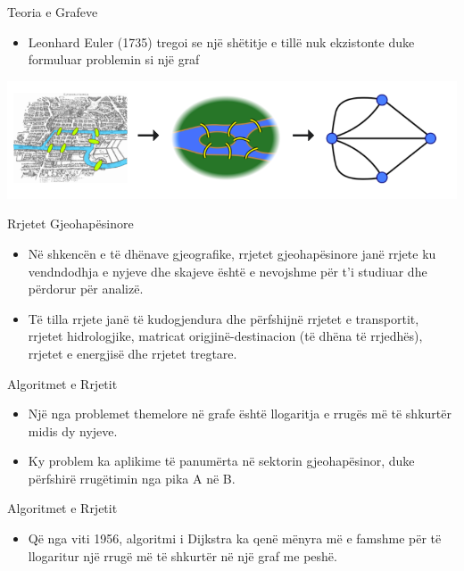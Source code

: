 \documentclass[
  ignorenonframetext,
]{beamer}
\providecommand{\tightlist}{%
  \setlength{\itemsep}{0pt}\setlength{\parskip}{0pt}}
\begin{document}
\begin{frame}{Teoria e Grafeve}
\protect\hypertarget{teoria-e-grafeve-3}{}
\begin{itemize}
\tightlist
\item
  Leonhard Euler (1735) tregoi se një shëtitje e tillë nuk ekzistonte
  duke formuluar problemin si një graf
\end{itemize}

\includegraphics{./Figs/eiler.png}
\end{frame}

\begin{frame}{Rrjetet Gjeohapësinore}
\protect\hypertarget{rrjetet-gjeohapuxebsinore}{}
\begin{itemize}
\item
  Në shkencën e të dhënave gjeografike, rrjetet gjeohapësinore janë
  rrjete ku vendndodhja e nyjeve dhe skajeve është e nevojshme për t'i
  studiuar dhe përdorur për analizë.
\item
  Të tilla rrjete janë të kudogjendura dhe përfshijnë rrjetet e
  transportit, rrjetet hidrologjike, matricat origjinë-destinacion (të
  dhëna të rrjedhës), rrjetet e energjisë dhe rrjetet tregtare.
\end{itemize}
\end{frame}

\begin{frame}{Algoritmet e Rrjetit}
\protect\hypertarget{algoritmet-e-rrjetit}{}
\begin{itemize}
\item
  Një nga problemet themelore në grafe është llogaritja e rrugës më të
  shkurtër midis dy nyjeve.
\item
  Ky problem ka aplikime të panumërta në sektorin gjeohapësinor, duke
  përfshirë rrugëtimin nga pika A në B.
\end{itemize}
\end{frame}

\begin{frame}{Algoritmet e Rrjetit}
\protect\hypertarget{algoritmet-e-rrjetit-1}{}
\begin{itemize}
\tightlist
\item
  Që nga viti 1956, algoritmi i Dijkstra ka qenë mënyra më e famshme për
  të llogaritur një rrugë më të shkurtër në një graf me peshë.
\end{itemize}
\end{frame}
\end{document}
